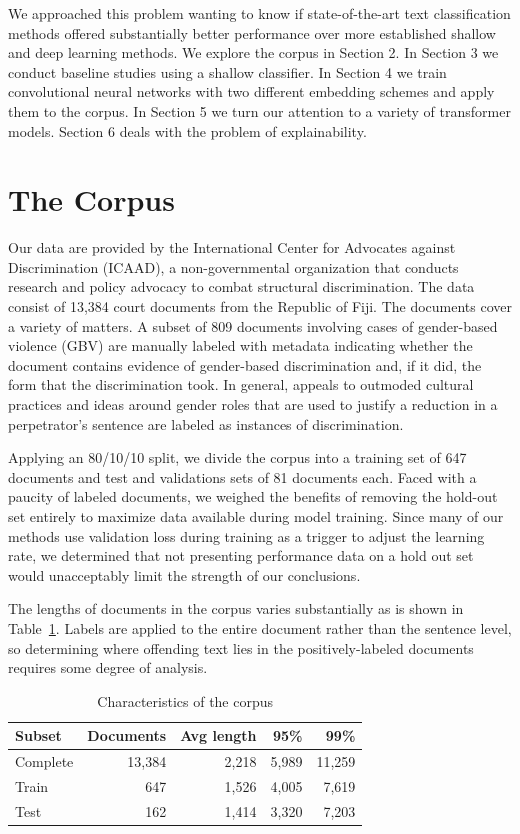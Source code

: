 \documentclass[twocolumn,10pt]{wmrDoc}
\begin{document}
We approached this problem wanting to know if state-of-the-art text classification methods offered substantially better performance over more established shallow and deep learning methods.  We explore the corpus in Section 2.  In Section 3 we conduct baseline studies using a shallow classifier.  In Section 4 we train convolutional neural networks with two different embedding schemes and apply them to the corpus.  In Section 5 we turn our attention to a variety of transformer models.  Section 6 deals with the problem of explainability.

\section{The Corpus}
Our data are provided by the International Center for Advocates against Discrimination (ICAAD), a non-governmental organization that conducts research and policy advocacy to combat structural discrimination. The data consist of 13,384 court documents from the Republic of Fiji. The documents cover a variety of matters. A subset of 809 documents involving cases of gender-based violence (GBV) are manually labeled with metadata indicating whether the document contains evidence of gender-based discrimination and, if it did, the form that the discrimination took. In general, appeals to outmoded cultural practices and ideas around gender roles that are used to justify a reduction in a perpetrator’s sentence are labeled as instances of discrimination.

Applying an 80/10/10 split, we divide the corpus into a training set of 647 documents and test and validations sets of 81 documents each.  Faced with a paucity of labeled documents, we weighed the benefits of removing the hold-out set entirely to maximize data available during model training.  Since many of our methods use validation loss during training as a trigger to adjust the learning rate, we determined that not presenting performance data on a hold out set would unacceptably limit the strength of our conclusions.

The lengths of documents in the corpus varies substantially as is shown in Table~\ref{tab:corpus}. Labels are applied to the entire document rather than the sentence level, so determining where offending text lies in the positively-labeled documents requires some degree of analysis.

\begin{table}
 \caption{Characteristics of the corpus}
  \centering
  \begin{tabular}{lrrrr}
    \toprule
    Subset   & Documents  & Avg length & 95\% & 99\%\\
    \midrule
    Complete & 13,384  & 2,218 & 5,989 & 11,259     \\
    Train    & 647  & 1,526 & 4,005 & 7,619      \\
    Test     & 162  & 1,414 & 3,320 & 7,203      \\
    \bottomrule
  \end{tabular}
  \label{tab:corpus}
\end{table}
\end{document}

